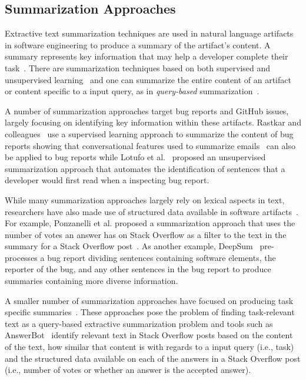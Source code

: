 \subsection{Summarization Approaches}
\label{cp2:summarization}



Extractive text summarization techniques are used in natural language artifacts in software engineering to
produce a summary of the artifact's content. 
A summary represents key information that may help a developer complete their task~\cite{Bavota2016}.
There are summarization techniques based on both supervised and unsupervised learning~\cite{moreno2017}
and one can summarize the entire content of an artifact
or content specific to a input query, as in \textit{query-based} summarization~\cite{Huang2018, Goldsteinet1999}.




A number of summarization approaches target bug reports and GitHub issues, largely
focusing on identifying key information within these artifacts. 
Rastkar and colleagues~\cite{Rastkar2010} use a supervised learning approach to summarize the content 
of bug reports showing that conversational features used to summarize emails~\cite{Murray2008}
can also be applied to bug reports while
Lotufo et al.~\cite{Lotufo2012} proposed an unsupervised summarization approach 
that automates the identification of sentences that a developer would first read when
a inspecting bug report.



While many summarization approaches
largely rely on  lexical aspects in text, researchers have also made use
of structured data available in software artifacts~\cite{Ponzanelli2015, Treude2016, chen2016}. 
For example, Ponzanelli et al. 
proposed a summarization approach
that uses the number of votes an answer has on 
Stack Overflow as a filter to the text in 
the summary for a Stack Overflow post~\cite{Ponzanelli2015}. 
As another example, DeepSum~\cite{Li2018} pre-processes a bug report dividing sentences 
containing software elements, the reporter of the bug, and any other sentences 
in the bug report to produce summaries containing more diverse information.




A smaller number of summarization approaches have focused on
producing task specific summaries~\cite{Xu2017, silva2019}.
These approaches pose the problem of finding task-relevant text 
as a query-based extractive summarization problem and
tools such as AnswerBot~\cite{Xu2017}
identify relevant text in Stack Overflow posts 
based on 
the content of the text, how similar that content is with regards to a input query (i.e., task)
and the structured data available on each of the answers in a Stack Overflow post 
(i.e., number of votes or whether an answer is the accepted answer).



